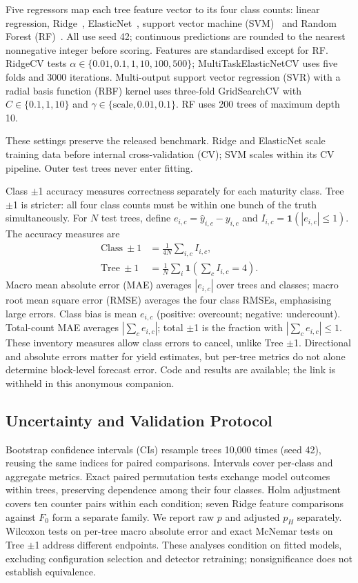 \documentclass[conference,a4paper]{IEEEtran}
\begin{document}
Five regressors map each tree feature vector to its four class counts: linear regression, Ridge~\cite{ref19},
ElasticNet~\cite{ref17}, support vector machine (SVM)~\cite{ref20} and Random Forest (RF)~\cite{ref18}.
All use seed 42; continuous predictions are rounded to the nearest
nonnegative integer before scoring. Features are
standardised except for RF. RidgeCV tests
$\alpha\in\{0.01,0.1,1,10,100,500\}$; MultiTaskElasticNetCV uses five folds and
3000 iterations. Multi-output support vector regression (SVR) with a radial basis function (RBF) kernel uses three-fold GridSearchCV with
$C\in\{0.1,1,10\}$ and $\gamma\in\{\mathrm{scale},0.01,0.1\}$.
RF uses 200 trees of maximum depth 10.

These settings preserve the released benchmark.
Ridge and ElasticNet scale training data before internal cross-validation (CV); SVM scales within its
CV pipeline. Outer test trees never enter fitting.

Class $\pm$1 accuracy measures correctness separately for each maturity class.
Tree $\pm$1 is stricter: all four class counts must be within one bunch of
the truth simultaneously. For $N$ test trees, define $e_{i,c}=\hat y_{i,c}-y_{i,c}$ and
$I_{i,c}=\mathbf1(|e_{i,c}|\leq1)$. The accuracy measures are
\begin{align}
\mathrm{Class}\ \pm1&=\frac{1}{4N}\sum_{i,c}I_{i,c},\\
\mathrm{Tree}\ \pm1&=\frac{1}{N}\sum_i\mathbf1\!\left(\sum_c I_{i,c}=4\right).
\end{align}
Macro mean absolute error (MAE) averages $|e_{i,c}|$ over trees and classes; macro root mean square error (RMSE) averages
the four class RMSEs, emphasising large errors. Class bias is mean $e_{i,c}$
(positive: overcount; negative: undercount). Total-count MAE averages
$|\sum_c e_{i,c}|$; total $\pm$1 is the fraction with $|\sum_c e_{i,c}|\leq1$.
These inventory measures allow class errors to cancel, unlike Tree $\pm$1.
Directional and absolute errors matter for yield estimates, but per-tree
metrics do not alone determine block-level forecast error. Code and results
are available; the link is withheld in this anonymous companion.

\subsection{Uncertainty and Validation Protocol}
\label{sec:stats}

Bootstrap confidence intervals (CIs) resample trees 10,000 times (seed 42), reusing
the same indices for paired comparisons. Intervals cover per-class and aggregate
metrics. Exact paired permutation tests exchange model outcomes within trees,
preserving dependence among their four classes. Holm adjustment covers ten
counter pairs within each condition; seven Ridge feature comparisons against
$F_0$ form a separate family. We report raw $p$ and adjusted $p_H$ separately.
Wilcoxon tests on per-tree macro absolute error and exact McNemar tests on Tree
$\pm$1 address different endpoints. These analyses condition on fitted models,
excluding configuration selection and detector retraining; nonsignificance
does not establish equivalence.
\end{document}

